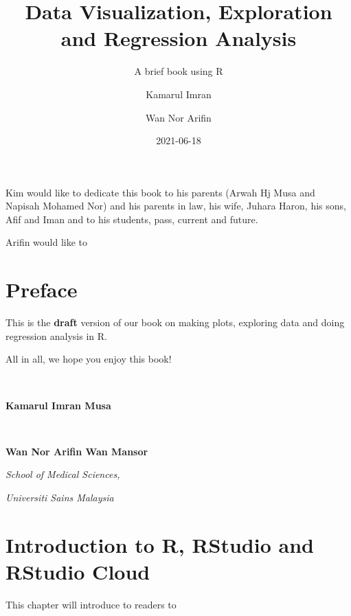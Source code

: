 \documentclass[
]{book}
\title{Data Visualization, Exploration and Regression Analysis}
\subtitle{A brief book using R}
\author{Kamarul Imran \and Wan Nor Arifin}
\date{2021-06-18}
\begin{document}
\maketitle


\thispagestyle{empty}

\begin{center}
Kim would like to dedicate this book to his parents (Arwah Hj Musa and Napisah Mohamed Nor) and his parents in law, his wife, Juhara Haron, his sons, Afif and Iman and to his students, pass, current and future.

Arifin would like to


\end{center}

\setlength{\abovedisplayskip}{-5pt}
\setlength{\abovedisplayshortskip}{-5pt}

{
\hypersetup{linkcolor=}
\setcounter{tocdepth}{2}
\tableofcontents
}
\listoftables
\listoffigures
\hypertarget{preface}{%
\chapter*{Preface}\label{preface}}


This is the \textbf{draft} version of our book on making plots, exploring data and doing regression analysis in R.

All in all, we hope you enjoy this book!

~

\textbf{Kamarul Imran Musa}

~

\textbf{Wan Nor Arifin Wan Mansor}

\emph{School of Medical Sciences,}

\emph{Universiti Sains Malaysia}

\mainmatter

\hypertarget{introduction-to-r-rstudio-and-rstudio-cloud}{%
\chapter{Introduction to R, RStudio and RStudio Cloud}\label{introduction-to-r-rstudio-and-rstudio-cloud}}

This chapter will introduce to readers to
\end{document}
